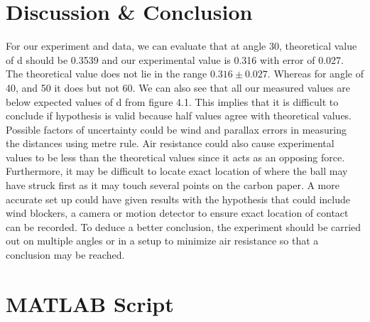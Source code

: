 \section{Discussion \& Conclusion}
For our experiment and data, we can evaluate that at angle 30, theoretical value of d should be 0.3539 and our experimental value is 0.316 with error of 0.027. The theoretical value does not lie in the range $0.316 \pm 0.027$. Whereas for angle of 40, and 50 it does but not 60. We can also see that all our measured values are below expected values of d from figure 4.1. This implies that it is difficult to conclude if hypothesis is valid because half values agree with theoretical values. Possible factors of uncertainty could be wind and parallax errors in measuring the distances using metre rule. Air resistance could also cause experimental values to be less than the theoretical values since it acts as an opposing force. Furthermore, it may be difficult to locate exact location of where the ball may have struck first as it may touch several points on the carbon paper. A more accurate set up could have given results with the hypothesis that could include wind blockers, a camera or motion detector to ensure exact location of contact can be recorded. To deduce a better conclusion, the experiment should be carried out on multiple angles or in a setup to minimize air resistance so that a conclusion may be reached.     



\section{MATLAB Script}


